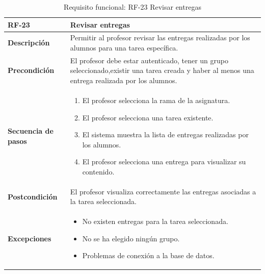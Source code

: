 \begin{table}[H]
\centering
\begin{tabularx}{\textwidth}{
  |>{\centering\arraybackslash}l
  |>{\centering\arraybackslash}X|}
\hline
\textbf{RF-23} & \textbf{Revisar entregas} \\ \hline

\textbf{Descripción} & Permitir al profesor revisar las entregas realizadas por los alumnos para una tarea específica. \\ \hline

\textbf{Precondición} & El profesor debe estar autenticado, tener un grupo seleccionado,existir una tarea creada y haber al menos una entrega realizada por los alumnos. \\ \hline

\textbf{Secuencia de pasos} &
\begin{enumerate}
  \item El profesor selecciona la rama de la asignatura.
  \item El profesor selecciona una tarea existente.
  \item El sistema muestra la lista de entregas realizadas por los alumnos.
  \item El profesor selecciona una entrega para visualizar su contenido.
\end{enumerate} \\ \hline

\textbf{Postcondición} & El profesor visualiza correctamente las entregas asociadas a la tarea seleccionada. \\ \hline

\textbf{Excepciones} &
\begin{itemize}
  \item No existen entregas para la tarea seleccionada.
  \item No se ha elegido ningún grupo.
  \item Problemas de conexión a la base de datos.
\end{itemize} \\ \hline
\end{tabularx}
\caption{Requisito funcional: RF-23 Revisar entregas}
\label{tab:RF-23}
\end{table}


